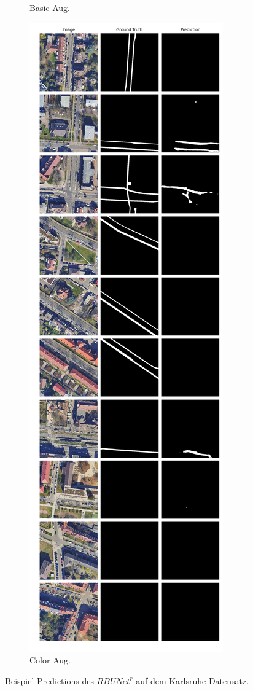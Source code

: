 \begin{figure}
\begin{subfigure}{.4\textwidth}
		\caption{Basic Aug.}
	\end{subfigure}
	\begin{subfigure}{.4\textwidth}
		\centering
		\includegraphics[width=1.\textwidth]{Bilder/karlsruhe-color-samples/rbunet-r.png}
		\caption{Color Aug.}
	\end{subfigure}
	\caption{Beispiel-Predictions des $RBUNet^r$ auf dem Karlsruhe-Datensatz.}
	\label{fig:ka-samples-rbunet-r}
	\end{figure}
	
